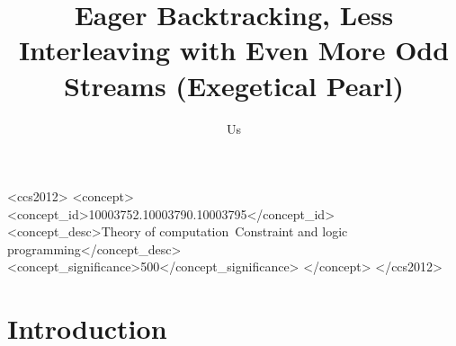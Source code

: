 \documentclass[screen,anonymous,review,draft,natbib=false]{acmart} %
\begin{document}
\title{Eager Backtracking, Less Interleaving with Even More Odd
  Streams (Exegetical Pearl)}

\author{Us}



\begin{abstract}
\end{abstract}

\begin{CCSXML}
<ccs2012>
   <concept>
       <concept_id>10003752.10003790.10003795</concept_id>
       <concept_desc>Theory of computation~Constraint and logic programming</concept_desc>
       <concept_significance>500</concept_significance>
       </concept>
 </ccs2012>
\end{CCSXML}




\maketitle




\section{Introduction}\label{sec:intro}
\end{document}
